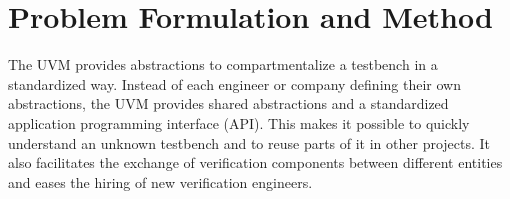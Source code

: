   
\chapter{Problem Formulation and Method} %

The UVM provides abstractions to compartmentalize a testbench in a standardized way. Instead of each engineer or
company defining their own abstractions, the UVM provides shared abstractions and a standardized application
programming interface (API). This makes it possible to quickly
understand an unknown testbench and to reuse parts of it in other projects. It also facilitates the exchange of
verification components between different entities and eases the hiring of new verification engineers.

